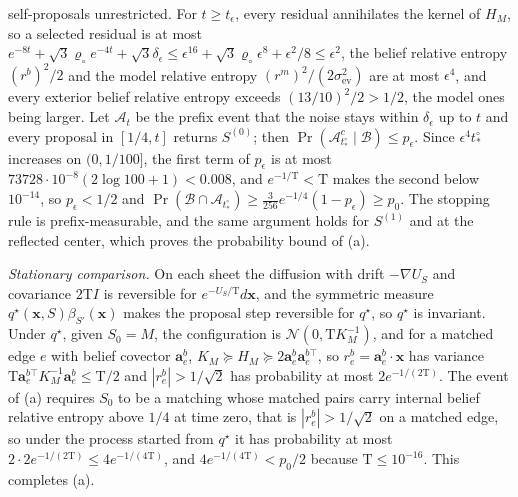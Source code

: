self-proposals unrestricted. For \(t\ge t_\epsilon\), every residual
annihilates the kernel of \(H_M\), so a selected residual is at most
\(e^{-8t}+\sqrt3\varrho_\circ e^{-4t}+\sqrt3\delta_\epsilon\le
\epsilon^{16}+\sqrt3\varrho_\circ\epsilon^8+\epsilon^2/8\le\epsilon^2\), the belief
relative entropy \((r^b)^2/2\) and the model relative entropy
\((r^m)^2/(2\sigma^2_{\mathrm{ev}})\) are at most \(\epsilon^4\), and every
exterior belief relative entropy exceeds \((13/10)^2/2>1/2\), the model ones
being larger. Let \(\mathscr A_t\) be the prefix event that the noise stays
within \(\delta_\epsilon\) up to \(t\) and every proposal in \([1/4,t]\) returns
\(S^{(0)}\); then \(\Pr(\mathscr A_{t^\circ_*}^c\mid\mathscr B)\le p_\epsilon\).
Since \(\epsilon^4t^\circ_*\) increases on \((0,1/100]\), the first term of
\(p_\epsilon\) is at most \(73728\cdot10^{-8}(2\log100+1)<0.008\), and
\(e^{-1/\mathrm T}<\mathrm T\) makes the second below \(10^{-14}\), so
\(p_\epsilon<1/2\) and
\(\Pr(\mathscr B\cap\mathscr A_{t^\circ_*})\ge\tfrac3{256}e^{-1/4}(1-p_\epsilon)\ge p_0\).
The stopping rule is prefix-measurable, and the same argument holds for
\(S^{(1)}\) and at the reflected center, which proves the probability bound
of (a).

\emph{Stationary comparison.} On each sheet the diffusion with drift
\(-\nabla U_S\) and covariance \(2\mathrm TI\) is reversible for
\(e^{-U_S/\mathrm T}d\mathbf x\), and the symmetric measure
\(q^\star(\mathbf x,S)\beta_{S'}(\mathbf x)\) makes the proposal step
reversible for \(q^\star\), so \(q^\star\) is invariant. Under \(q^\star\),
given \(S_0=M\), the configuration is \(\mathcal N(0,\mathrm TK_M^{-1})\), and
for a matched edge \(e\) with belief covector \(\mathbf a^b_e\),
\(K_M\succeq H_M\succeq2\mathbf a^b_e\mathbf a^{b\top}_e\), so
\(r^b_e=\mathbf a^b_e\cdot\mathbf x\) has variance
\(\mathrm T\mathbf a^{b\top}_eK_M^{-1}\mathbf a^b_e\le\mathrm T/2\) and
\(|r^b_e|>1/\sqrt2\) has probability at most \(2e^{-1/(2\mathrm T)}\). The
event of (a) requires \(S_0\) to be a matching whose matched pairs carry
internal belief relative entropy above \(1/4\) at time zero, that is
\(|r^b_e|>1/\sqrt2\) on a matched edge, so under the process started from
\(q^\star\) it has probability at most \(2\cdot2e^{-1/(2\mathrm T)}\le4e^{-1/(4\mathrm T)}\),
and \(4e^{-1/(4\mathrm T)}<p_0/2\) because \(\mathrm T\le10^{-16}\). This
completes (a).

